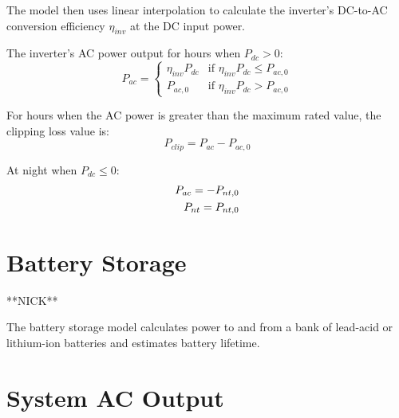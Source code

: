 \documentclass[12pt,letterpaper]{article}
\begin{document}
The model then uses linear interpolation to calculate the inverter's DC-to-AC conversion efficiency $\eta_{inv}$ at the DC input power.

The inverter's AC power output for hours when $P_{dc}>0$:
\begin{equation}
P_{ac} = \left\{
\begin{array}{ll}
\eta_{inv} P_{dc} & \text{if $\eta_{inv} P_{dc} \leq P_{ac,0}$}\\
P_{ac,0} & \text{if $\eta_{inv} P_{dc} > P_{ac,0}$} 
\end{array}\right.
\end{equation}

For hours when the AC power is greater than the maximum rated value, the clipping loss value is:
\begin{equation}
P_{clip} = P_{ac} - P_{ac,0}
\end{equation}

At night when $P_{dc} \leq 0$:
\begin{align}
P_{ac} = -P_{nt,0} \notag\\
P_{nt} = P_{nt,0}
\end{align}

\chapter{Battery Storage}\label{battery}

**NICK**

The battery storage model calculates power to and from a bank of lead-acid or lithium-ion batteries and estimates battery lifetime.

\chapter{System AC Output}
\end{document}
